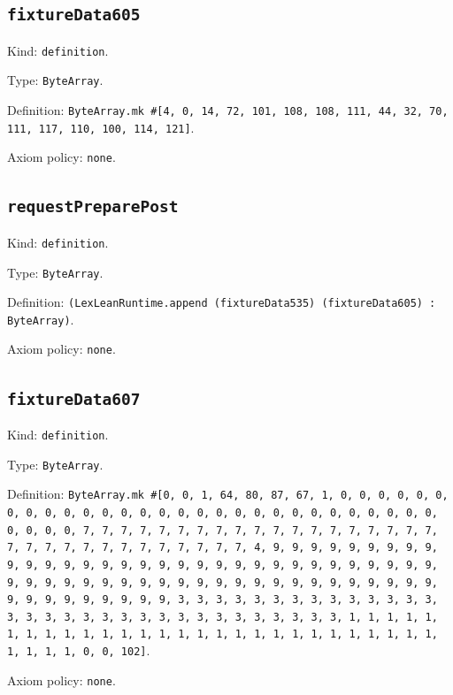 \documentclass[11pt]{article}
\begin{document}
\subsection*{\texttt{fixtureData605}}
\noindent Kind: \texttt{definition}.\par
\noindent Type: \texttt{ByteArray}.\par
\noindent Definition: \texttt{ByteArray.mk \#[4, 0, 14, 72, 101, 108, 108, 111, 44, 32, 70, 111, 117, 110, 100, 114, 121]}.\par
\noindent Axiom policy: \texttt{none}.\par
\subsection*{\texttt{requestPreparePost}}
\noindent Kind: \texttt{definition}.\par
\noindent Type: \texttt{ByteArray}.\par
\noindent Definition: \texttt{(LexLeanRuntime.append (fixtureData535) (fixtureData605) : ByteArray)}.\par
\noindent Axiom policy: \texttt{none}.\par
\subsection*{\texttt{fixtureData607}}
\noindent Kind: \texttt{definition}.\par
\noindent Type: \texttt{ByteArray}.\par
\noindent Definition: \texttt{ByteArray.mk \#[0, 0, 1, 64, 80, 87, 67, 1, 0, 0, 0, 0, 0, 0, 0, 0, 0, 0, 0, 0, 0, 0, 0, 0, 0, 0, 0, 0, 0, 0, 0, 0, 0, 0, 0, 0, 0, 0, 0, 0, 0, 7, 7, 7, 7, 7, 7, 7, 7, 7, 7, 7, 7, 7, 7, 7, 7, 7, 7, 7, 7, 7, 7, 7, 7, 7, 7, 7, 7, 7, 7, 7, 7, 4, 9, 9, 9, 9, 9, 9, 9, 9, 9, 9, 9, 9, 9, 9, 9, 9, 9, 9, 9, 9, 9, 9, 9, 9, 9, 9, 9, 9, 9, 9, 9, 9, 9, 9, 9, 9, 9, 9, 9, 9, 9, 9, 9, 9, 9, 9, 9, 9, 9, 9, 9, 9, 9, 9, 9, 9, 9, 9, 9, 9, 9, 9, 9, 9, 3, 3, 3, 3, 3, 3, 3, 3, 3, 3, 3, 3, 3, 3, 3, 3, 3, 3, 3, 3, 3, 3, 3, 3, 3, 3, 3, 3, 3, 3, 3, 3, 1, 1, 1, 1, 1, 1, 1, 1, 1, 1, 1, 1, 1, 1, 1, 1, 1, 1, 1, 1, 1, 1, 1, 1, 1, 1, 1, 1, 1, 1, 1, 1, 0, 0, 102]}.\par
\noindent Axiom policy: \texttt{none}.\par
\end{document}
